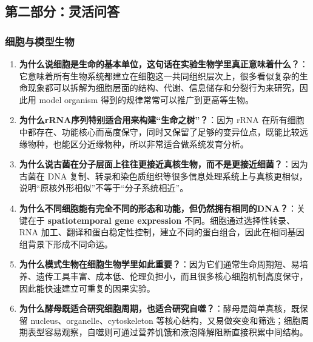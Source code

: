 \documentclass[12pt,fontset=none]{ctexart}
\begin{document}
\subsection*{第二部分：灵活问答}
\subsubsection*{细胞与模型生物}
\begin{enumerate}
\item \textbf{为什么说细胞是生命的基本单位，这句话在实验生物学里真正意味着什么？}：它意味着所有生物系统都建立在细胞这一共同组织层次上，很多看似复杂的生命现象都可以拆解为细胞层面的结构、代谢、信息储存和分裂行为来研究，因此用 model organism 得到的规律常常可以推广到更高等生物。

\item \textbf{为什么rRNA序列特别适合用来构建“生命之树”？}：因为 rRNA 在所有细胞中都存在、功能核心而高度保守，同时又保留了足够的变异位点，既能比较远缘物种，也能区分近缘物种，所以非常适合做系统发育分析。

\item \textbf{为什么说古菌在分子层面上往往更接近真核生物，而不是更接近细菌？}：因为古菌在 DNA 复制、转录和染色质组织等很多信息处理系统上与真核更相似，说明“原核外形相似”不等于“分子系统相近”。

\item \textbf{为什么不同细胞能有完全不同的形态和功能，但仍然拥有相同的DNA？}：关键在于 \textbf{spatiotemporal gene expression} 不同。细胞通过选择性转录、RNA 加工、翻译和蛋白稳定性控制，建立不同的蛋白组合，因此在相同基因组背景下形成不同命运。

\item \textbf{为什么模式生物在细胞生物学里如此重要？}：因为它们通常生命周期短、易培养、遗传工具丰富、成本低、伦理负担小，而且很多核心细胞机制高度保守，因此能快速建立可重复的因果实验。

\item \textbf{为什么酵母既适合研究细胞周期，也适合研究自噬？}：酵母是简单真核，既保留 nucleus、organelle、cytoskeleton 等核心结构，又易做突变和筛选；细胞周期表型容易观察，自噬则可通过营养饥饿和液泡降解阻断直接积累中间结构。

\end{enumerate}
\end{document}
